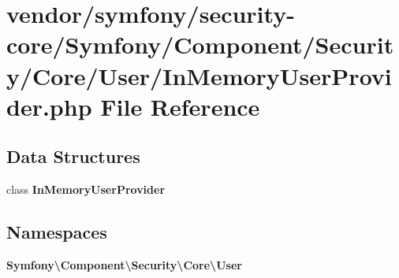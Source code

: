 \section{vendor/symfony/security-\/core/\+Symfony/\+Component/\+Security/\+Core/\+User/\+In\+Memory\+User\+Provider.php File Reference}
\label{_in_memory_user_provider_8php}
\subsection*{Data Structures}
\begin{DoxyCompactItemize}
\item 
class {\bf In\+Memory\+User\+Provider}
\end{DoxyCompactItemize}
\subsection*{Namespaces}
\begin{DoxyCompactItemize}
\item 
 {\bf Symfony\textbackslash{}\+Component\textbackslash{}\+Security\textbackslash{}\+Core\textbackslash{}\+User}
\end{DoxyCompactItemize}
